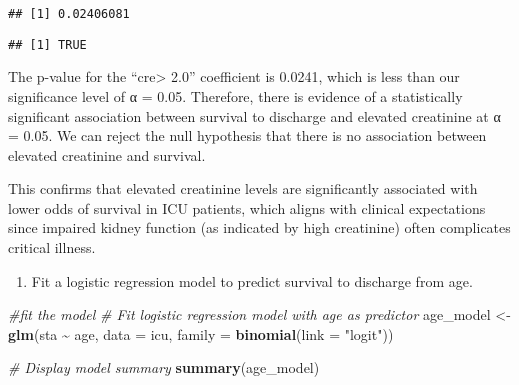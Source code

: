 \documentclass[
]{article}
\newenvironment{Shaded}{\begin{snugshade}}{\end{snugshade}}
\newcommand{\AttributeTok}[1]{\textcolor[rgb]{0.13,0.29,0.53}{#1}}
\newcommand{\CommentTok}[1]{\textcolor[rgb]{0.56,0.35,0.01}{\textit{#1}}}
\newcommand{\FloatTok}[1]{\textcolor[rgb]{0.00,0.00,0.81}{#1}}
\newcommand{\FunctionTok}[1]{\textcolor[rgb]{0.13,0.29,0.53}{\textbf{#1}}}
\newcommand{\NormalTok}[1]{#1}
\newcommand{\OtherTok}[1]{\textcolor[rgb]{0.56,0.35,0.01}{#1}}
\newcommand{\SpecialCharTok}[1]{\textcolor[rgb]{0.81,0.36,0.00}{\textbf{#1}}}
\newcommand{\StringTok}[1]{\textcolor[rgb]{0.31,0.60,0.02}{#1}}
\providecommand{\tightlist}{%
  \setlength{\itemsep}{0pt}\setlength{\parskip}{0pt}}
\begin{document}
\begin{verbatim}
## [1] 0.02406081
\end{verbatim}

\begin{Shaded}
\end{Shaded}

\begin{verbatim}
## [1] TRUE
\end{verbatim}

The p-value for the ``cre\textgreater{} 2.0'' coefficient is 0.0241,
which is less than our significance level of α = 0.05. Therefore, there
is evidence of a statistically significant association between survival
to discharge and elevated creatinine at α = 0.05. We can reject the null
hypothesis that there is no association between elevated creatinine and
survival.

This confirms that elevated creatinine levels are significantly
associated with lower odds of survival in ICU patients, which aligns
with clinical expectations since impaired kidney function (as indicated
by high creatinine) often complicates critical illness.

\begin{enumerate}
\def\labelenumi{\arabic{enumi}.}
\setcounter{enumi}{4}
\tightlist
\item
  Fit a logistic regression model to predict survival to discharge from
  age.
\end{enumerate}

\begin{Shaded}
\begin{Highlighting}[]
\CommentTok{\#fit the model}
\CommentTok{\# Fit logistic regression model with age as predictor}
\NormalTok{age\_model }\OtherTok{\textless{}{-}} \FunctionTok{glm}\NormalTok{(sta }\SpecialCharTok{\textasciitilde{}}\NormalTok{ age, }\AttributeTok{data =}\NormalTok{ icu, }\AttributeTok{family =} \FunctionTok{binomial}\NormalTok{(}\AttributeTok{link =} \StringTok{"logit"}\NormalTok{))}

\CommentTok{\# Display model summary}
\FunctionTok{summary}\NormalTok{(age\_model)}
\end{Highlighting}
\end{Shaded}
\end{document}
